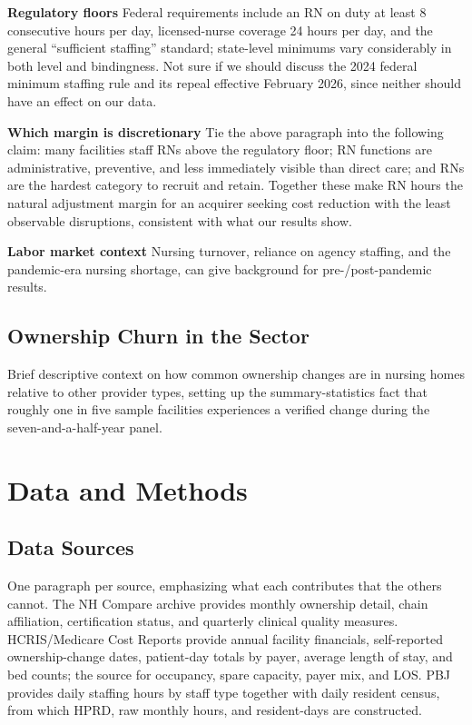 \documentclass[12pt]{article}
\begin{document}
\medskip
\noindent\textbf{Regulatory floors} Federal requirements include an RN on duty at least 8 consecutive hours per day, licensed-nurse coverage 24 hours per day, and the general ``sufficient staffing'' standard; state-level minimums vary considerably in both level and bindingness. Not sure if we should discuss the 2024 federal minimum staffing rule and its repeal effective February 2026, since neither should have an effect on our data.

\medskip
\noindent\textbf{Which margin is discretionary} Tie the above paragraph into the following claim: many facilities staff RNs above the regulatory floor; RN functions are administrative, preventive, and less immediately visible than direct care; and RNs are the hardest category to recruit and retain. Together these make RN hours the natural adjustment margin for an acquirer seeking cost reduction with the least observable disruptions, consistent with what our results show.

\medskip
\noindent\textbf{Labor market context} Nursing turnover, reliance on agency staffing, and the pandemic-era nursing shortage, can give background for pre-/post-pandemic results.

\subsection{Ownership Churn in the Sector} \label{sec:background-churn}

Brief descriptive context on how common ownership changes are in nursing homes relative to other provider types, setting up the summary-statistics fact that roughly one in five sample facilities experiences a verified change during the seven-and-a-half-year panel.

\section{Data and Methods} \label{sec:dataandmethods}

\subsection{Data Sources}

One paragraph per source, emphasizing what each contributes that the others cannot. The NH Compare archive provides monthly ownership detail, chain affiliation, certification status, and quarterly clinical quality measures. HCRIS/Medicare Cost Reports provide annual facility financials, self-reported ownership-change dates, patient-day totals by payer, average length of stay, and bed counts; the source for occupancy, spare capacity, payer mix, and LOS. PBJ provides daily staffing hours by staff type together with daily resident census, from which HPRD, raw monthly hours, and resident-days are constructed. 
\end{document}
